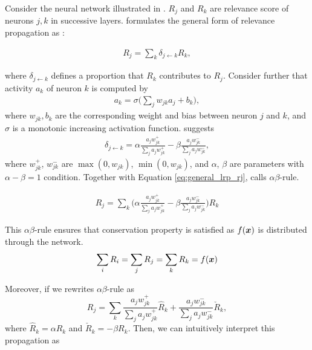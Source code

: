 Consider the neural network illustrated in \addfigure{\ref{fig:lrp_graph}}. $R_j$ and $R_k$ are relevance score of  neurons $j,k$ in successive layers.  \cite{BinderLayerwiseRelevancePropagation2016} formulates the general form of relevance propagation as :

\begin{align} \label{eq:general_lrp_rj}
	R_j = \sum_{k} 	\delta_{j\leftarrow k} R_{k} ,
\end{align}

where $\delta_{j\leftarrow k}$ defines a proportion that  $R_{k}$ contributes to $R_j$. Consider further that activity $a_k$ of neuron $k$ is computed by 
\begin{align*}
	a_k = \sigma \bigg( \sum_{j} w_{jk} a_j + b_k \bigg),
\end{align*} 
where $w_{jk}, b_k$ are the corresponding weight and bias between neuron $j$ and $k$, and $\sigma$ is a monotonic increasing activation function. \cite{BinderLayerwiseRelevancePropagation2016} suggests 
\begin{align}
	\delta_{j\leftarrow k} = \alpha\frac{a_j w_{jk}^+}{\sum_{j} a_jw_{jk}^+} - \beta\frac{a_j w_{jk}^-}{\sum_{j} a_jw_{jk}^-},
\end{align}
where $w_{jk}^+$, $w_{jk}^-$ are $\max(0, w_{jk})$, $\min(0, w_{jk})$, and $\alpha$,  $\beta$ are parameters with $\alpha-\beta = 1$ condition. Together with Equation \ref{eq:general_lrp_rj}, \cite{BinderLayerwiseRelevancePropagation2016} calls $\alpha\beta$-rule.

\begin{align}
	R_j = \sum_{k} 	\bigg( \alpha\frac{a_j w_{jk}^+}{\sum_{j} a_jw_{jk}^+} - \beta\frac{a_j w_{jk}^-}{\sum_{j} a_jw_{jk}^-} \bigg )  R_{k}
\end{align}


This $\alpha\beta$-rule ensures that conservation property is satisfied as $f(\patvector{x})$ is distributed through the network. 
\begin{align*}
	\sum_{i} R_i = 	\sum_{j} R_j = 	\sum_{k} R_k = f(\patvector{x})
\end{align*}

Moreover, if we rewrites  $\alpha\beta$-rule as 
$$
	R_j = \sum_{k}  \frac{a_j w_{jk}^+}{\sum_{j} a_jw_{jk}^+} \hat{R}_{k} + \frac{a_j w_{jk}^-}{\sum_{j} a_jw_{jk}^-} \check{R}_{k},
$$ 
where $\hat{R}_{k}  = \alpha R_{k}$ and  $\check{R}_{k} = -\beta R_{k} $. Then, we can intuitively interpret this propagation as 

